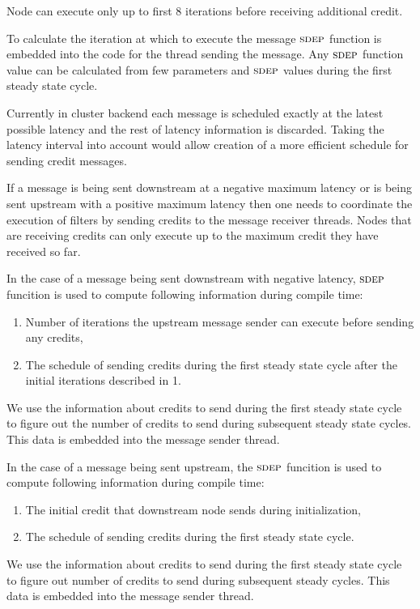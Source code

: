 Node can execute only up to first 8 iterations before receiving additional credit.

To calculate the iteration at which to execute the message $\textsc{sdep}$
function is embedded into the code for the thread sending the
message. Any $\textsc{sdep}$ function value can be calculated from few
parameters and $\textsc{sdep}$ values during the first steady state cycle.

Currently in cluster backend each message is scheduled exactly at the 
latest possible
latency and the rest of latency information is discarded. Taking the
latency interval into account would allow creation of a more efficient
schedule for sending credit messages.

If a message is being sent downstream at a negative maximum latency 
or is being sent upstream with a positive maximum latency
then one needs to coordinate the execution of filters by sending
credits to the message receiver threads. Nodes that are receiving 
credits can only execute up to the maximum credit they have received so far.

In the case of a message being sent downstream with negative latency,
$\textsc{sdep}$ funcition is used to compute following information during compile 
time:

\begin{enumerate}
\item Number of iterations the upstream message sender can execute before sending any credits,
\item The schedule of sending credits during the first steady state cycle after the initial iterations described in 1.
\end{enumerate}

We use the information about credits to send during the first steady state 
cycle to figure out the number of credits to send during subsequent steady
state cycles. This data is embedded into the message sender thread.

In the case of a message being sent upstream, 
the $\textsc{sdep}$ funcition is used to compute following information during compile 
time:

\begin{enumerate}
\item The initial credit that downstream node sends during initialization,
\item The schedule of sending credits during the first steady state cycle.
\end{enumerate}

We use the information about credits to send during the first steady state 
cycle to figure out number of credits to send during subsequent steady
cycles. This data is embedded into the message sender thread.
